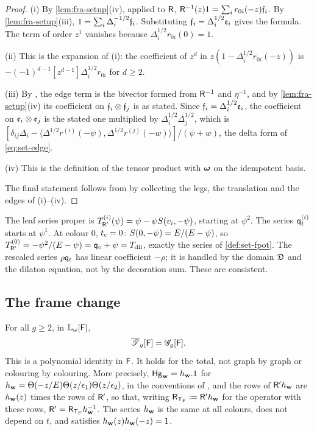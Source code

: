 \begin{proof}
(i) By \cref{lem:fra-setup}(iv), applied to $\mathsf{R}$, $\mathsf{R}^{-1}(z)1=\sum_ir_{0i}(-z)\mathfrak{f}_i$. By \cref{lem:fra-setup}(iii), $1=\sum_i\Delta_i^{-1/2}\mathfrak{f}_i$. Substituting $\mathfrak{f}_i=\Delta_i^{1/2}\mathfrak{e}_i$ gives the formula. The term of order $z^1$ vanishes because $\Delta_i^{1/2}r_{0i}(0)=1$.

(ii) This is the expansion of (i): the coefficient of $z^d$ in $z(1-\Delta_i^{1/2}r_{0i}(-z))$ is $-(-1)^{d-1}[z^{d-1}]\Delta_i^{1/2}r_{0i}$ for $d\geq2$.

(iii) By \cite[Definition~2.2]{PPZ15}, the edge term is the bivector formed from $\mathsf{R}^{-1}$ and $\eta^{-1}$, and by \cref{lem:fra-setup}(iv) its coefficient on $\mathfrak{f}_i\otimes\mathfrak{f}_j$ is as stated. Since $\mathfrak{f}_i=\Delta_i^{1/2}\mathfrak{e}_i$, the coefficient on $\mathfrak{e}_i\otimes\mathfrak{e}_j$ is the stated one multiplied by $\Delta_i^{1/2}\Delta_j^{1/2}$, which is $[\delta_{ij}\Delta_i-\langle\Delta^{1/2}r^{(i)}(-\psi),\Delta^{1/2}r^{(j)}(-w)\rangle]/(\psi+w)$, the delta form of \eqref{eq:set-edge}.

(iv) This is the definition of the tensor product with $\boldsymbol{\omega}$ on the idempotent basis.

The final statement follows from \cite[Definitions~2.2, 2.5, 2.13]{PPZ15} by collecting the legs, the translation and the edges of (i)--(iv).
\end{proof}

\begin{rmk}
\label{rmk:fra-leaves}
The leaf series proper is $T_{\mathsf{R}'}^{(i)}(\psi)=\psi-\psi S(v_i,-\psi)$, starting at $\psi^2$. The series $\mathsf{q}_{t}^{(i)}$ starts at $\psi^1$. At colour $0$, $t_{\mathrm{c}}=0$: $S(0,-\psi)=E/(E-\psi)$, so $T_{\mathsf{R}'}^{(0)}=-\psi^2/(E-\psi)=\mathsf{q}_{\circ}+\psi=T_{\mathrm{dil}}$, exactly the series of \cref{def:set-fpot}. The rescaled series $\rho\mathsf{q}_{t}$ has linear coefficient $-\rho$; it is handled by the domain $\mathfrak{D}$ and the dilaton equation, not by the decoration sum. These are consistent.
\end{rmk}

\subsection{The frame change}

\begin{thm}
\label{thm:fra-change}
For all $g\geq2$, in $\mathbb{L}_{\omega}[\mathsf{F}]$,
\[
\overline{\mathscr{T}}_g[\mathsf{F}]=\mathscr{G}_g[\mathsf{F}].
\]
This is a polynomial identity in $\mathsf{F}$. It holds for the total, not graph by graph or colouring by colouring. More precisely, $\mathsf{Hg}_{\mathbf{w}}=h_{\mathbf{w}}.1$ for $h_{\mathbf{w}}=\Theta(-z/E)\Theta(z/\epsilon_1)\Theta(z/\epsilon_2)$, in the conventions of \cite[Definition~2.13]{PPZ15}, and the rows of $\mathsf{R}'h_{\mathbf{w}}$ are $h_{\mathbf{w}}(z)$ times the rows of $\mathsf{R}'$, so that, writing $\mathsf{R}_{\mathsf{T}_{\mathrm{F}}}\coloneqq\mathsf{R}'h_{\mathbf{w}}$ for the operator with these rows, $\mathsf{R}'=\mathsf{R}_{\mathsf{T}_{\mathrm{F}}}h_{\mathbf{w}}^{-1}$. The series $h_{\mathbf{w}}$ is the same at all colours, does not depend on $t$, and satisfies $h_{\mathbf{w}}(z)h_{\mathbf{w}}(-z)=1$.
\end{thm}

